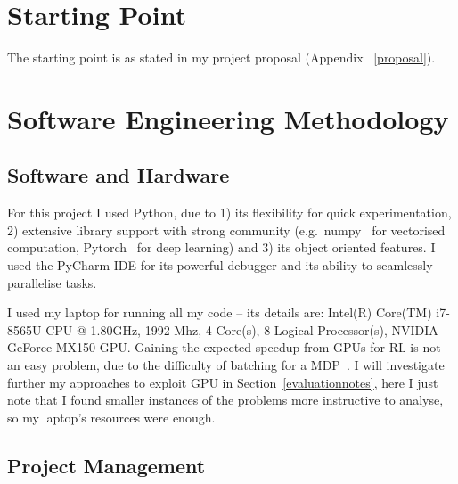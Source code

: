 \section{Starting Point}

The starting point is as stated in my project proposal (Appendix ~\ref{proposal}). 


\section{Software Engineering Methodology}





\subsection{Software and Hardware}


For this project I used Python, due to 1) its flexibility for quick experimentation, 2) extensive library support with strong community (e.g.\ numpy~\cite{harris2020numpy} for vectorised computation, Pytorch~\cite{paszke2019pytorch} for deep learning) and 3) its object oriented features. I used the PyCharm IDE for its powerful debugger and its ability to seamlessly parallelise tasks.


I used my laptop for running all my code -- its details are: Intel(R) Core(TM) i7-8565U CPU @ 1.80GHz, 1992 Mhz, 4 Core(s), 8 Logical Processor(s), NVIDIA GeForce MX150 GPU. Gaining the expected speedup from GPUs for RL is not an easy problem, due to the difficulty of batching for a MDP~\cite{stooke2018gpudeepRL}. I will investigate further my approaches to exploit GPU in Section~\ref{evaluationnotes}, here I just note that I found smaller instances of the problems more instructive to analyse, so my laptop's resources were enough.


\subsection{Project Management}

